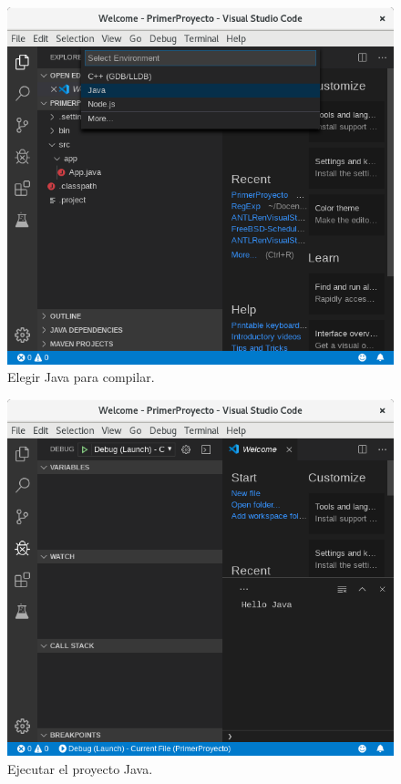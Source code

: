 \documentclass[a5paper,10pt]{article}
\begin{document}
\begin{figure}[t]
	\centering
	\includegraphics[width=.95\textwidth]{img/PrimerCompilacion}
	\caption{Elegir Java para compilar.}
	\label{java_project}
\end{figure}

\begin{figure}[t]
	\centering
	\includegraphics[width=.95\textwidth]{img/PrimeraEjecucion}
	\caption{Ejecutar el proyecto Java.}
	\label{hello_java}
\end{figure}
\end{document}
